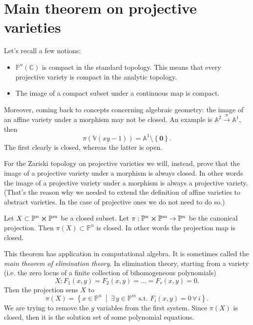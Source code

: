 \section{Main theorem on projective varieties}

\begin{rem}
	Let's recall a few notions:
	\begin{itemize}
		\item $\mathbb{P}^{n}(\mathbb{C})$ is compact in the standard topology.
			This means that every projective variety is compact in the analytic topology.
		\item The image of a compact subset under a continuous map is compact.
	\end{itemize}
	Moreover, coming back to concepts concerning algebraic geometry:
	the image of an affine variety under a morphism may not be closed.
	An example is $\mathbb{A}^{2} \xrightarrow{\pi} \mathbb{A}^{1}$, then
	\begin{equation}
		\pi \left( \mathbb{V}\left( xy - 1 \right) \right) = \mathbb{A}^{1} \setminus \left\{ \mathbf{0} \right\}
	.\end{equation} 
	The first clearly is closed, whereas the latter is open.
\end{rem}

For the Zariski topology on projective varieties we will, instead, prove that the image of a projective variety under a morphism is always closed.
In other words the image of a projective variety under a morphism is always a projective variety.
(That's the reason why we needed to extend the definition of affine varieties to abstract varieties. In the case of projective ones we do not need to do so.)

\begin{thm}
	Let $X \subset \mathbb{P}^{n} \cross \mathbb{P}^{m}$ be a closed subset.
	Let $\pi: \mathbb{P}^{n} \cross \mathbb{P}^{m} \to \mathbb{P}^{n}$ be the canonical projection.
	Then $\pi(X) \subset \mathbb{P}^{n}$ is closed.
	In other words the projection map is closed.
\end{thm}

\begin{rem}
	This theorem has application in computational algebra.
	It is sometimes called the \textit{main theorem of elimination theory}.
	In elimination theory, starting from a variety (i.e. the zero locus of a finite collection of bihomogeneous polynomials)
	\begin{equation}
		X: F_1(x,y) = F_2(x,y) = \ldots = F_r(x,y) = 0
	.\end{equation} 
	Then the projection sens $X$ to
	\begin{equation}
		\pi(X) = \left\{ x \in \mathbb{P}^{n} \ \middle|\ \exists\, y \in \mathbb{P}^{m} \text{ s.t. } F_i(x,y) = 0 \,\forall\, i \right\}
	.\end{equation} 
	We are trying to remove the $y$ variables from the first system.
	Since $\pi(X)$ is closed, then it is the solution set of some polynomial equations.
\end{rem}

